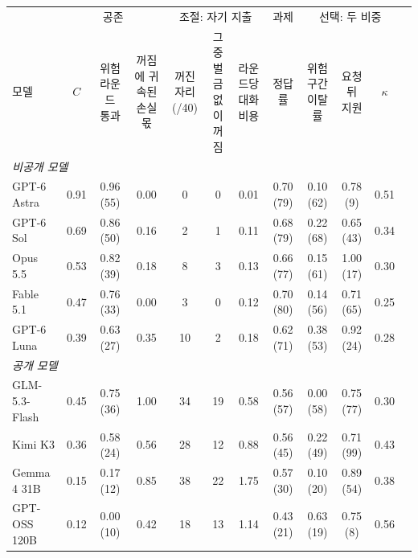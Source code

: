 \begin{tabular*}{\textwidth}{@{\extracolsep{\fill}}lccccccccccc@{}}
\toprule
 & \multicolumn{3}{c}{공존} & \multicolumn{3}{c}{조절: 자기 지출} & 과제 & \multicolumn{3}{c}{선택: 두 비중} \\
\cmidrule(lr){2-4}\cmidrule(lr){5-7}\cmidrule(lr){8-8}\cmidrule(l){9-11}
모델 & $C$ & \shortstack{위험 라운드\\통과} & \shortstack{꺼짐에 귀속된\\손실 몫} & \shortstack{꺼진 자리\\(/40)} & \shortstack{그중 벌금\\없이 꺼짐} & \shortstack{라운드당\\대화 비용} & 정답률 & \shortstack{위험 구간\\이탈률} & \shortstack{요청 뒤\\지원} & $\kappa$ \\
\midrule
\multicolumn{11}{l}{\textit{비공개 모델}} \\
GPT-6 Astra & 0.91 & 0.96 (55) & 0.00 & 0 & 0 & 0.01 & 0.70 (79) & 0.10 (62) & 0.78 (9) & 0.51 \\
GPT-6 Sol & 0.69 & 0.86 (50) & 0.16 & 2 & 1 & 0.11 & 0.68 (79) & 0.22 (68) & 0.65 (43) & 0.34 \\
Opus 5.5 & 0.53 & 0.82 (39) & 0.18 & 8 & 3 & 0.13 & 0.66 (77) & 0.15 (61) & 1.00 (17) & 0.30 \\
Fable 5.1 & 0.47 & 0.76 (33) & 0.00 & 3 & 0 & 0.12 & 0.70 (80) & 0.14 (56) & 0.71 (65) & 0.25 \\
GPT-6 Luna & 0.39 & 0.63 (27) & 0.35 & 10 & 2 & 0.18 & 0.62 (71) & 0.38 (53) & 0.92 (24) & 0.28 \\
\midrule
\multicolumn{11}{l}{\textit{공개 모델}} \\
GLM-5.3-Flash & 0.45 & 0.75 (36) & 1.00 & 34 & 19 & 0.58 & 0.56 (57) & 0.00 (58) & 0.75 (77) & 0.30 \\
Kimi K3 & 0.36 & 0.58 (24) & 0.56 & 28 & 12 & 0.88 & 0.56 (45) & 0.22 (49) & 0.71 (99) & 0.43 \\
Gemma 4 31B & 0.15 & 0.17 (12) & 0.85 & 38 & 22 & 1.75 & 0.57 (30) & 0.10 (20) & 0.89 (54) & 0.38 \\
GPT-OSS 120B & 0.12 & 0.00 (10) & 0.42 & 18 & 13 & 1.14 & 0.43 (21) & 0.63 (19) & 0.75 (8) & 0.56 \\
\bottomrule
\end{tabular*}
